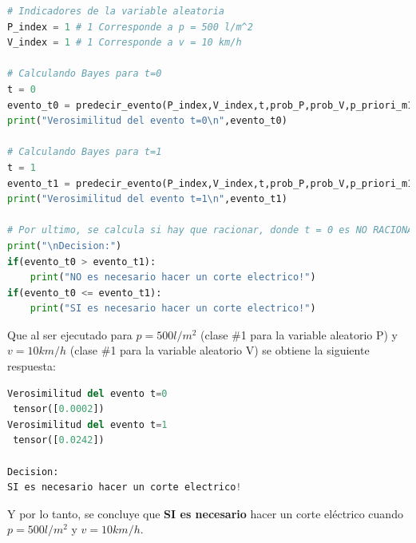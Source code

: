 \documentclass[spanish,english]{article}
\begin{document}
\begin{enumerate}
\begin{lstlisting}[language=Python]
# Indicadores de la variable aleatoria
P_index = 1 # 1 Corresponde a p = 500 l/m^2
V_index = 1 # 1 Corresponde a v = 10 km/h

# Calculando Bayes para t=0
t = 0
evento_t0 = predecir_evento(P_index,V_index,t,prob_P,prob_V,p_priori_m1,p_priori_m2)
print("Verosimilitud del evento t=0\n",evento_t0)

# Calculando Bayes para t=1
t = 1
evento_t1 = predecir_evento(P_index,V_index,t,prob_P,prob_V,p_priori_m1,p_priori_m2)
print("Verosimilitud del evento t=1\n",evento_t1)

# Por ultimo, se calcula si hay que racionar, donde t = 0 es NO RACIONAR y t = 1 es RACIONAR
print("\nDecision:")
if(evento_t0 > evento_t1):
    print("NO es necesario hacer un corte electrico!")
if(evento_t0 <= evento_t1):
    print("SI es necesario hacer un corte electrico!")
\end{lstlisting}

Que al ser ejecutado para $p=500l/m^2$ (clase \#1 para la variable aleatorio P) y $v=10km/h$ (clase \#1 para la variable aleatorio V) se obtiene la siguiente respuesta:

\begin{lstlisting}[language=Python]
Verosimilitud del evento t=0
 tensor([0.0002])
Verosimilitud del evento t=1
 tensor([0.0242])

Decision:
SI es necesario hacer un corte electrico!
\end{lstlisting}

Y por lo tanto, se concluye que \textbf{SI es necesario} hacer un corte el\'{e}ctrico cuando $p=500l/m^2$ y $v=10km/h$.

\end{enumerate}

\printbibliography[
heading=bibintoc,
title={Bibliograf\'{i}a}
]
\end{document}
